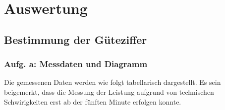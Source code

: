 \newpage
\section{Auswertung}
\label{sec:Auswertung}

\subsection{Bestimmung der Güteziffer}

\subsubsection{Aufg. a: Messdaten und Diagramm}

Die gemessenen Daten werden wie folgt tabellarisch dargestellt. Es sein beigemerkt, dass die Messung der Leistung aufgrund
von technischen Schwirigkeiten erst ab der fünften Minute erfolgen konnte.

